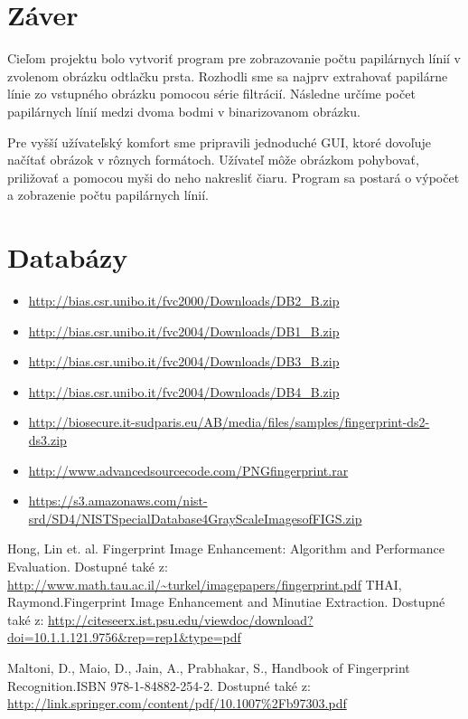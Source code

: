\documentclass[11pt,a4paper]{article}
\begin{document}
\pagebreak

\section*{Záver}
Cieľom projektu bolo vytvoriť program pre zobrazovanie počtu papilárnych línií v zvolenom obrázku odtlačku prsta. Rozhodli sme sa najprv extrahovať papilárne línie zo vstupného obrázku pomocou série filtrácií. Následne určíme počet papilárnych línií medzi dvoma bodmi v binarizovanom obrázku. 

Pre vyšší užívateľský komfort sme pripravili jednoduché GUI, ktoré dovoľuje načítať obrázok v rôznych formátoch. Užívateľ môže obrázkom pohybovať, priližovať a pomocou myši do neho nakresliť čiaru. Program sa postará o výpočet a zobrazenie počtu papilárnych línií.

\pagebreak
\section*{Databázy}
\begin{itemize}
	\item \url{http://bias.csr.unibo.it/fvc2000/Downloads/DB2_B.zip}
	\item \url{http://bias.csr.unibo.it/fvc2004/Downloads/DB1_B.zip}
	\item \url{http://bias.csr.unibo.it/fvc2004/Downloads/DB3_B.zip}
	\item \url{http://bias.csr.unibo.it/fvc2004/Downloads/DB4_B.zip}
	\item \url{http://biosecure.it-sudparis.eu/AB/media/files/samples/fingerprint-ds2-ds3.zip}
	\item \url{http://www.advancedsourcecode.com/PNGfingerprint.rar}
	\item \url{https://s3.amazonaws.com/nist-srd/SD4/NISTSpecialDatabase4GrayScaleImagesofFIGS.zip}
\end{itemize}

\begin{thebibliography}{9}
	Hong, Lin et. al. Fingerprint Image Enhancement: Algorithm and Performance Evaluation. Dostupné také z: \url{http://www.math.tau.ac.il/~turkel/imagepapers/fingerprint.pdf}
	THAI, Raymond.Fingerprint Image Enhancement and	Minutiae Extraction. Dostupné také z: \url{http://citeseerx.ist.psu.edu/viewdoc/download?doi=10.1.1.121.9756&rep=rep1&type=pdf}
	
	Maltoni, D., Maio, D., Jain, A., Prabhakar, S., Handbook of Fingerprint Recognition.ISBN 978-1-84882-254-2. Dostupné také z: \url{http://link.springer.com/content/pdf/10.1007%2Fb97303.pdf}
\end{thebibliography}
\end{document}

